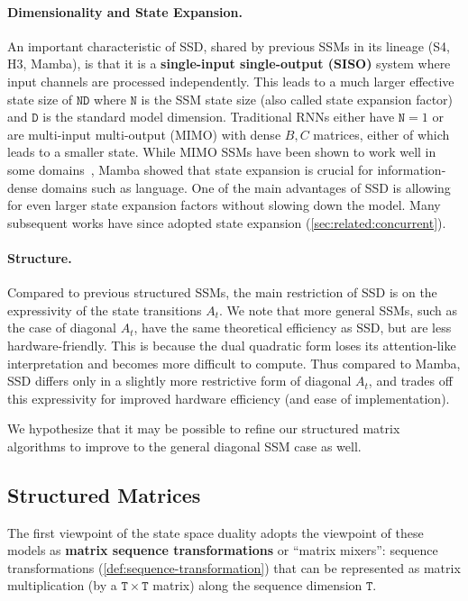 \paragraph{Dimensionality and State Expansion.}
An important characteristic of SSD, shared by previous SSMs in its lineage (S4, H3, Mamba), is that it is a \textbf{single-input single-output (SISO)} system where input channels are processed independently.
This leads to a much larger effective state size of $\mathtt{ND}$ where $\mathtt{N}$ is the SSM state size (also called state expansion factor) and $\mathtt{D}$ is the standard model dimension.
Traditional RNNs either have $\mathtt{N}=1$ or are
multi-input multi-output (MIMO) with dense $B, C$ matrices,
either of which leads to a smaller state.
While MIMO SSMs have been shown to work well in some domains~\citep{smith2023s5,orvieto2023resurrecting,lu2023structured}, Mamba showed that state expansion is crucial for information-dense domains such as language.
One of the main advantages of SSD is allowing for even larger state expansion factors without slowing down the model.
Many subsequent works have since adopted state expansion (\cref{sec:related:concurrent}).


\paragraph{Structure.}
Compared to previous structured SSMs,
the main restriction of SSD is on the expressivity of the state transitions $A_t$.
We note that more general SSMs, such as the case of diagonal $A_t$, have the same theoretical efficiency as SSD, but are less hardware-friendly.
This is because the dual quadratic form loses its attention-like interpretation and becomes more difficult to compute.
Thus compared to Mamba, SSD differs only in a slightly more restrictive form of diagonal $A_t$,
and trades off this expressivity for improved hardware efficiency (and ease of implementation).

We hypothesize that it may be possible to refine our structured matrix algorithms to improve to the general diagonal SSM case as well.

\subsection{Structured Matrices}
\label{sec:related:matrices}

The first viewpoint of the state space duality adopts the viewpoint of these models as \textbf{matrix sequence transformations} or ``matrix mixers'':
sequence transformations (\cref{def:sequence-transformation}) that can be represented as matrix multiplication (by a $\mathtt{T} \times \mathtt{T}$ matrix) along the sequence dimension $\mathtt{T}$.

